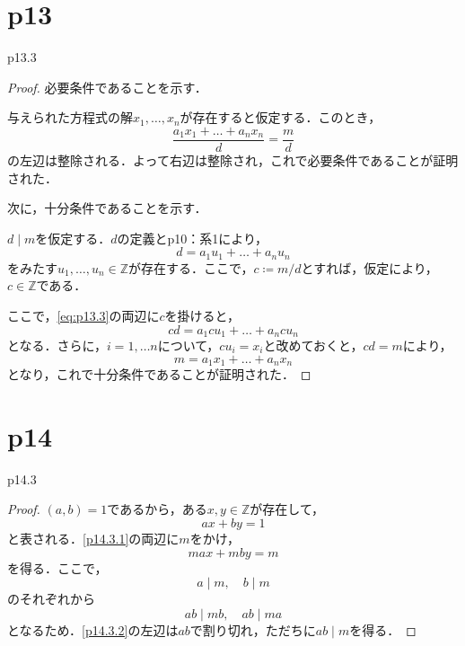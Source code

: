 \documentclass[dvipdfmx,uplatex,11pt]{jsarticle}
\theoremstyle{mytheorem}
\begin{document}
\section{p13}
p13.3
\begin{leftbar}
    \begin{proof}
        必要条件であることを示す．

        与えられた方程式の解$x_1 , \ldots , x_n$が存在すると仮定する．このとき，
        \[
            \frac{a_1 x_1 + \dots + a_n x_n}{d}=\frac{m}{d}
        \]
        の左辺は整除される．よって右辺は整除され，これで必要条件であることが証明された．

        次に，十分条件であることを示す．

        $ d \mid m$を仮定する．$d$の定義とp10：系1により，
        \begin{equation}
            \label{eq:p13.3}
            d= a_1 u_1 + \dots + a_n u_n
        \end{equation}
        をみたす$u_1 , \ldots , u_n \in \mathbb{Z}$が存在する．ここで，$ c \coloneqq m/d$とすれば，仮定により，$c \in \mathbb{Z}$である．

        ここで，\eqref{eq:p13.3}の両辺に$c$を掛けると，
        \[
            cd = a_1 c u_1 + \dots + a_n c u_n
        \]
        となる．さらに，$i = 1 , \ldots n$について，$c u_i = x_i$と改めておくと，$cd =m$により，
        \[
            m = a_1 x_1 + \dots + a_n x_n
        \]
        となり，これで十分条件であることが証明された．
    \end{proof}
    \end{leftbar}
    \newpage

    \section{p14}
    p14.3
    \begin{leftbar}
        \begin{proof}
            $(a,b)=1$であるから，ある$x , y \in \mathbb{Z}$が存在して，
            \begin{equation}
                \label{p14.3.1}
                ax + by =1
            \end{equation}
            と表される．\eqref{p14.3.1}の両辺に$m$をかけ，
            \begin{equation}
                \label{p14.3.2}
                max + mby =m
            \end{equation}
            を得る．ここで，
            \[
            a \mid m,\quad b \mid m
            \]
            のそれぞれから
            \[
            ab \mid mb,\quad ab \mid ma
            \]
            となるため．\eqref{p14.3.2}の左辺は$ab$で割り切れ，ただちに$ab \mid m$を得る．
        \end{proof}
    \end{leftbar}
\newpage
\end{document}
